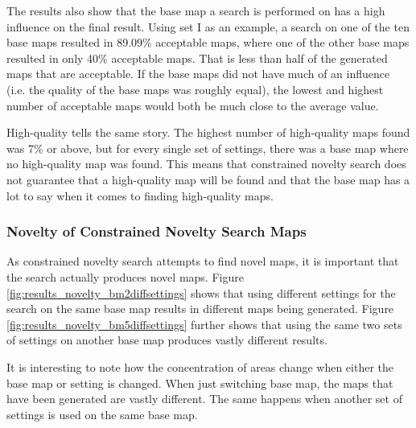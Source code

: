 The results also show that the base map a search is performed on has a high influence on the final result. Using set I as an example, a search on one of the ten base maps resulted in 89.09\% acceptable maps, where one of the other base maps resulted in only 40\% acceptable maps. That is less than half of the generated maps that are acceptable. If the base maps did not have much of an influence (i.e. the quality of the base maps was roughly equal), the lowest and highest number of acceptable maps would both be much close to the average value.

High-quality tells the same story. The highest number of high-quality maps found was 7\% or above, but for every single set of settings, there was a base map where no high-quality map was found. This means that constrained novelty search does not guarantee that a high-quality map will be found and that the base map has a lot to say when it comes to finding high-quality maps.

\subsubsection{Novelty of Constrained Novelty Search Maps}

As constrained novelty search attempts to find novel maps, it is important that the search actually produces novel maps. Figure \ref{fig:results_novelty_bm2diffsettings} shows that using different settings for the search on the same base map results in different maps being generated. Figure \ref{fig:results_novelty_bm5diffsettings} further shows that using the same two sets of settings on another base map produces vastly different results. 

It is interesting to note how the concentration of areas change when either the base map or setting is changed. When just switching base map, the maps that have been generated are vastly different. The same happens when another set of settings is used on the same base map.


